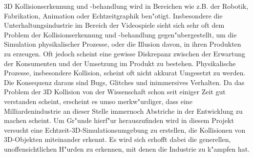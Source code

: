 
3D Kollisionserkennung und -behandlung wird in Bereichen wie z.B. der Robotik, Fabrikation, Animation oder Echtzeitgraphik ben"otigt.
Insbesondere die Unterhaltungsindustrie im Bereich der Videospiele sieht sich sehr oft dem Problem der Kollisionserkennung und -behandlung gegen"ubergestellt, um die Simulation physikalischer Prozesse, oder die Illusion davon, in ihren Produkten zu erzeugen.
Oft jedoch scheint eine gewisse Diskrepanz zwischen der Erwartung der Konsumenten und der Umsetzung im Produkt zu bestehen. Physikalische Prozesse, insbesondere Kollision, scheint oft nicht akkurat Umgesetzt zu werden. Die Konsequenz daraus sind Bugs, Glitches und inimmersives Verhalten.
Da das Problem der 3D Kollision von der Wissenschaft schon seit einiger Zeit gut verstanden scheint, erscheint es umso merkw"urdiger, dass eine Milliardenindustrie an dieser Stelle immernoch Abstriche in der Entwicklung zu machen scheint.
Um Gr"unde hierf"ur herauszufinden wird in diesem Projekt versucht eine Echtzeit-3D-Simulationsumgebung zu erstellen, die Kollisionen von 3D-Objekten miteinander erkennt.
Es wird sich erhofft dabei die generellen, unoffensichtlichen H"urden zu erkennen, mit denen die Industrie zu k"ampfen hat.
